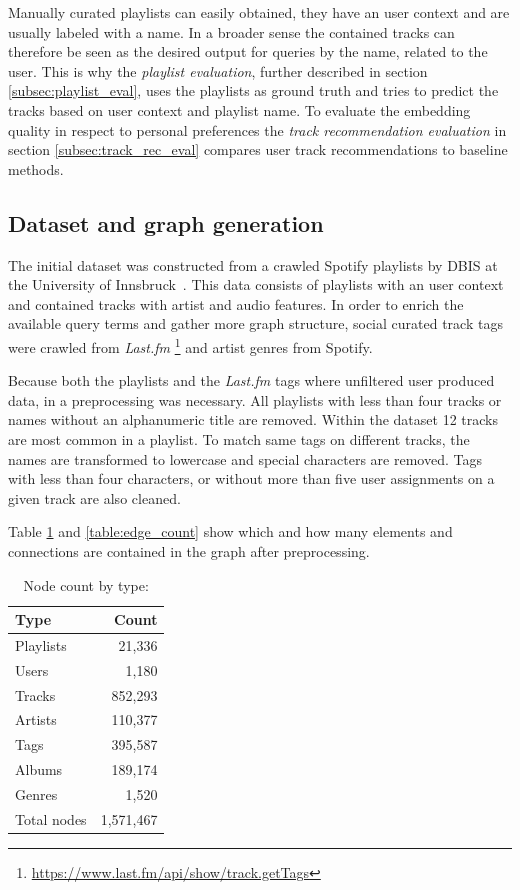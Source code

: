 \documentclass[sigconf]{acmart}
\begin{document}
Manually curated playlists can easily obtained, they have an user context and are usually labeled with a name. In a broader sense the contained tracks can therefore be seen as the desired output for queries by the name, related to the user. This is why the \emph{playlist evaluation}, further described in section \ref{subsec:playlist_eval}, uses the playlists as ground truth and tries to predict the tracks based on user context and playlist name. To evaluate the embedding quality in respect to personal preferences the \emph{track recommendation evaluation} in section \ref{subsec:track_rec_eval} compares user track recommendations to baseline methods.


\subsection{Dataset and graph generation}
The initial dataset was constructed from a crawled Spotify playlists by DBIS at the University of Innsbruck~\cite{pichl2017improving}. This data consists of playlists with an user context and contained tracks with artist and audio features. In order to enrich the available query terms and gather more graph structure, social curated track tags were crawled from \emph{Last.fm} \footnote{\url{https://www.last.fm/api/show/track.getTags}} and artist genres from Spotify.

Because both the playlists and the \emph{Last.fm} tags where unfiltered user produced data, in a preprocessing was necessary. All playlists with less than four tracks or names without an alphanumeric title are removed. Within the dataset 12 tracks are most common in a playlist. To match same tags on different tracks, the names are transformed to lowercase and special characters are removed. Tags with less than four characters, or without more than five user assignments on a given track are also cleaned.

Table \ref{table:node_count} and \ref{table:edge_count} show which and how many elements and connections are contained in the graph after preprocessing.

\begin{table}[H]
	\caption{Node count by type:}
	\label{table:node_count}
	\begin{tabular}{lr}
		\midrule 
		\textbf{Type} & \textbf{Count} \\ 
		\midrule 
		Playlists & 21,336  \\
		Users     & 1,180     \\
		Tracks    & 852,293 \\
		Artists   & 110,377  \\
		Tags      & 395,587    \\
		Albums    & 189,174    \\
		Genres	  & 1,520	\\
		\midrule 
		Total nodes & 1,571,467\\
		\bottomrule
	\end{tabular}
\end{table}
\end{document}
